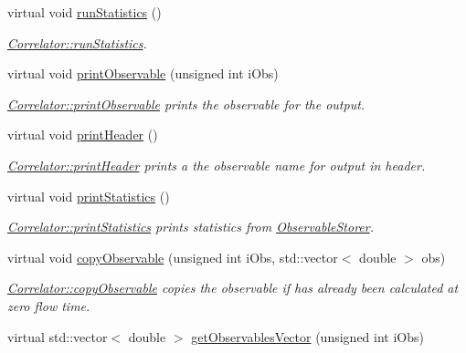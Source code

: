 \begin{DoxyCompactItemize}
virtual void \mbox{\hyperlink{class_correlator_a35197b1d12b62ef30b79c0138a26456e}{run\+Statistics}} ()
\begin{DoxyCompactList}\small\item\em \mbox{\hyperlink{class_correlator_a35197b1d12b62ef30b79c0138a26456e}{Correlator\+::run\+Statistics}}. \end{DoxyCompactList}\item 
virtual void \mbox{\hyperlink{class_correlator_a15744ddb9f2b71fff34ac762d101df38}{print\+Observable}} (unsigned int i\+Obs)
\begin{DoxyCompactList}\small\item\em \mbox{\hyperlink{class_correlator_a15744ddb9f2b71fff34ac762d101df38}{Correlator\+::print\+Observable}} prints the observable for the output. \end{DoxyCompactList}\item 
virtual void \mbox{\hyperlink{class_correlator_ac7c5a07d7cbee97c417a1659b93083b2}{print\+Header}} ()
\begin{DoxyCompactList}\small\item\em \mbox{\hyperlink{class_correlator_ac7c5a07d7cbee97c417a1659b93083b2}{Correlator\+::print\+Header}} prints a the observable name for output in header. \end{DoxyCompactList}\item 
virtual void \mbox{\hyperlink{class_correlator_a2168d677f547769784781d2e2aaa53cf}{print\+Statistics}} ()
\begin{DoxyCompactList}\small\item\em \mbox{\hyperlink{class_correlator_a2168d677f547769784781d2e2aaa53cf}{Correlator\+::print\+Statistics}} prints statistics from \mbox{\hyperlink{class_observable_storer}{Observable\+Storer}}. \end{DoxyCompactList}\item 
virtual void \mbox{\hyperlink{class_correlator_ac780d8b180294ee4801ede6e6a13f7f4}{copy\+Observable}} (unsigned int i\+Obs, std\+::vector$<$ double $>$ obs)
\begin{DoxyCompactList}\small\item\em \mbox{\hyperlink{class_correlator_ac780d8b180294ee4801ede6e6a13f7f4}{Correlator\+::copy\+Observable}} copies the observable if has already been calculated at zero flow time. \end{DoxyCompactList}\item 
virtual std\+::vector$<$ double $>$ \mbox{\hyperlink{class_correlator_a7fb062b098beb078f3e546f4717b4941}{get\+Observables\+Vector}} (unsigned int i\+Obs)

\end{DoxyCompactItemize}
